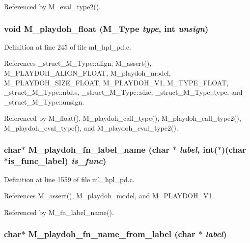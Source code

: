 Referenced by M\_\-eval\_\-type2().
\subsubsection{\setlength{\rightskip}{0pt plus 5cm}void M\_\-playdoh\_\-float (\bf{M\_\-Type} {\em type}, int {\em unsign})}\label{ml__hpl__pd_8c_fefcb24abd713c1081964e52d9f44529}




Definition at line 245 of file ml\_\-hpl\_\-pd.c.

References \_\-struct\_\-M\_\-Type::align, M\_\-assert(), M\_\-PLAYDOH\_\-ALIGN\_\-FLOAT, M\_\-playdoh\_\-model, M\_\-PLAYDOH\_\-SIZE\_\-FLOAT, M\_\-PLAYDOH\_\-V1, M\_\-TYPE\_\-FLOAT, \_\-struct\_\-M\_\-Type::nbits, \_\-struct\_\-M\_\-Type::size, \_\-struct\_\-M\_\-Type::type, and \_\-struct\_\-M\_\-Type::unsign.

Referenced by M\_\-float(), M\_\-playdoh\_\-call\_\-type(), M\_\-playdoh\_\-call\_\-type2(), M\_\-playdoh\_\-eval\_\-type(), and M\_\-playdoh\_\-eval\_\-type2().
\subsubsection{\setlength{\rightskip}{0pt plus 5cm}char$\ast$ M\_\-playdoh\_\-fn\_\-label\_\-name (char $\ast$ {\em label}, int($\ast$)(char $\ast$is\_\-func\_\-label) {\em is\_\-func})}\label{ml__hpl__pd_8c_453736e60fc78894dc1a0a579a750106}




Definition at line 1559 of file ml\_\-hpl\_\-pd.c.

References M\_\-assert(), M\_\-playdoh\_\-model, and M\_\-PLAYDOH\_\-V1.

Referenced by M\_\-fn\_\-label\_\-name().
\subsubsection{\setlength{\rightskip}{0pt plus 5cm}char$\ast$ M\_\-playdoh\_\-fn\_\-name\_\-from\_\-label (char $\ast$ {\em label})}\label{ml__hpl__pd_8c_8359fd4ab3e87a2ff7cf97abd741c27d}




